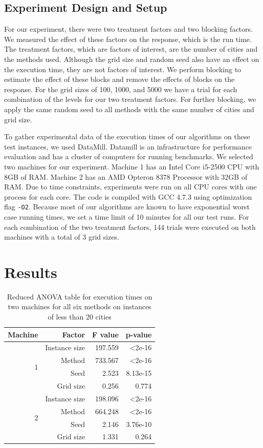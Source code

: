 \documentclass[11pt]{article}
\begin{document}
	\subsection{Experiment Design and Setup}
	\label{sec:environment}
	For our experiment, there were two treatment factors and two blocking factors. We measured the effect of these factors on the response, which is the run time. The treatment factors, which are factors of interest, are the number of cities and the methods used. Although the grid size and random seed also have an effect on the execution time, they are not factors of interest. We perform blocking to estimate the effect of these blocks and remove  the effects of blocks on the response. For the grid sizes of 100, 1000, and 5000 we have a trial for each combination of the levels for our two treatment factors. For further blocking, we apply the same random seed to all methods with the same number of cities and grid size. 
	
	To gather experimental data of the execution times of our algorithms on these test instances, we used DataMill. Datamill is an infrastructure for performance evaluation and has a cluster of computers for running benchmarks. We selected two machines for our experiment. Machine 1 has an Intel Core i5-2500 CPU with 8GB of RAM. Machine 2 has an AMD Opteron 8378 Processor with 32GB of RAM. Due to time constraints, experiments were run on all CPU cores with one process for each core. The code is compiled with GCC 4.7.3 using optimization flag \texttt{-O2}. Because most of our algorithms are known to have exponential worst case running times, we set a time limit of 10 minutes for all our test runs. For each combination of the two treatment factors, 144 trials were executed on both machines with a total of 3 grid sizes. 
	
	\section{Results}
	\label{sec:results}
	\begin{table}
	\centering
	\begin{tabular}{r|r|rr}
		Machine & Factor & F value & p-value  \\
		\hline
		\hline
		\multirow{4}{*}{1} 
		& Instance size             & 197.559 & \textless 2e-16 \\
		& Method             & 733.567 & \textless 2e-16 \\
		\cline{2-4}
		& Seed            & 2.523 & 8.13e-15 \\
		& Grid size & 0.256 & 0.774 \\
		\hline
		\multirow{4}{*}{2}
		& Instance size             & 198.096 & \textless 2e-16 \\
		& Method             & 664.248 & \textless 2e-16 \\
		\cline{2-4}
		& Seed            & 2.146 & 3.76e-10 \\
		& Grid size & 1.331 & 0.264 \\
	\end{tabular}
	\caption{Reduced ANOVA table for execution times on two machines for all six methods on instances of less than 20 cities}
	\label{tab:runtime_small_anova}
\end{table}
	
\end{document}
